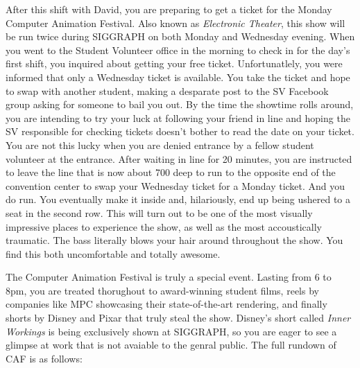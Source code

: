\documentclass[../main.tex]{subfiles}
\begin{document}
After this shift with David, you are preparing to get a ticket for the Monday Computer Animation Festival. Also known as \textit{Electronic Theater}, this show will be run twice during SIGGRAPH on both Monday and Wednesday evening. When you went to the Student Volunteer office in the morning to check in for the day's first shift, you inquired about getting your free ticket. Unfortunatlely, you were informed that only a Wednesday ticket is available. You take the ticket and hope to swap with another student, making a desparate post to the SV Facebook group asking for someone to bail you out. By the time the showtime rolls around, you are intending to try your luck at following your friend in line and hoping the SV responsible for checking tickets doesn't bother to read the date on your ticket. You are not this lucky when you are denied entrance by a fellow student volunteer at the entrance. After waiting in line for 20 minutes, you are instructed to leave the line that is now about 700 deep to run to the opposite end of the convention center to swap your Wednesday ticket for a Monday ticket. And you do run. You eventually make it inside and, hilariously, end up being ushered to a seat in the second row. This will turn out to be one of the most visually impressive places to experience the show, as well as the most accoustically traumatic. The bass literally blows your hair around throughout the show. You find this both uncomfortable and totally awesome.

The Computer Animation Festival is truly a special event. Lasting from 6 to 8pm, you are treated thorughout to award-winning student films, reels by companies like MPC showcasing their state-of-the-art rendering, and finally shorts by Disney and Pixar that truly steal the show. Disney's short called \textit{Inner Workings} is being exclusively shown at SIGGRAPH, so you are eager to see a glimpse at work that is not avaiable to the genral public. The full rundown of CAF is as follows:
\end{document}

